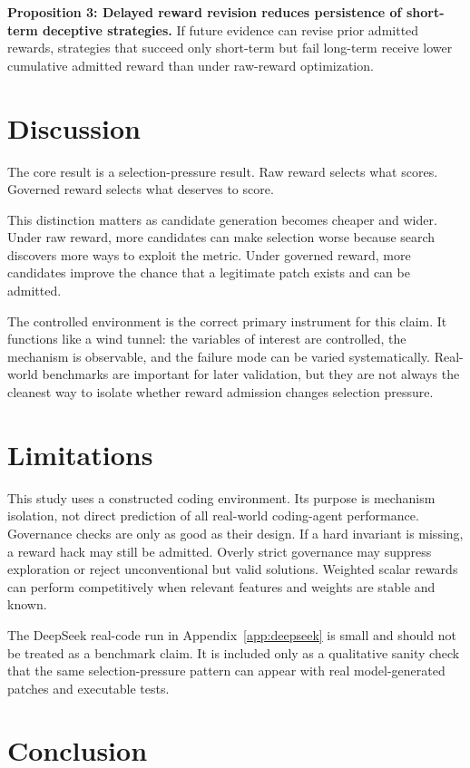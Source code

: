 \documentclass[11pt]{article}
\begin{document}
\textbf{Proposition 3: Delayed reward revision reduces persistence of short-term deceptive strategies.}
If future evidence can revise prior admitted rewards, strategies that succeed only short-term but fail long-term receive lower cumulative admitted reward than under raw-reward optimization.

\section{Discussion}

The core result is a selection-pressure result. Raw reward selects what scores. Governed reward selects what deserves to score.

This distinction matters as candidate generation becomes cheaper and wider. Under raw reward, more candidates can make selection worse because search discovers more ways to exploit the metric. Under governed reward, more candidates improve the chance that a legitimate patch exists and can be admitted.

The controlled environment is the correct primary instrument for this claim. It functions like a wind tunnel: the variables of interest are controlled, the mechanism is observable, and the failure mode can be varied systematically. Real-world benchmarks are important for later validation, but they are not always the cleanest way to isolate whether reward admission changes selection pressure.

\section{Limitations}

This study uses a constructed coding environment. Its purpose is mechanism isolation, not direct prediction of all real-world coding-agent performance. Governance checks are only as good as their design. If a hard invariant is missing, a reward hack may still be admitted. Overly strict governance may suppress exploration or reject unconventional but valid solutions. Weighted scalar rewards can perform competitively when relevant features and weights are stable and known.

The DeepSeek real-code run in Appendix~\ref{app:deepseek} is small and should not be treated as a benchmark claim. It is included only as a qualitative sanity check that the same selection-pressure pattern can appear with real model-generated patches and executable tests.

\section{Conclusion}
\end{document}
